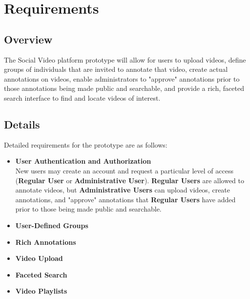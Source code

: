 %
\chapter{Requirements}
\label{sec:requirements}

\section{Overview}
\label{sec:requirements:overview}

The Social Video platform prototype will allow for users to upload videos, define groups of individuals that are invited to annotate that video, create actual annotations on videos, enable administrators to "approve" annotations prior to those annotations being made public and searchable, and provide a rich, faceted search interface to find and locate videos of interest.

\section{Details}
\label{sec:requirements:details}

Detailed requirements for the prototype are as follows:

\begin{itemize}[leftmargin=*]
\item \textbf{User Authentication and Authorization} \\
	New users may create an account and request a particular level of access (\textbf{Regular User} or \textbf{Administrative User}).  \textbf{Regular Users} are allowed to annotate videos, but \textbf{Administrative Users} can upload videos, create annotations, and "approve" annotations that \textbf{Regular Users} have added prior to those being made public and searchable.
\item \textbf{User-Defined Groups} \\

\item \textbf{Rich Annotations} \\

\item \textbf{Video Upload} \\
	
\item \textbf{Faceted Search} \\

\item \textbf{Video Playlists} \\

\end{itemize}


